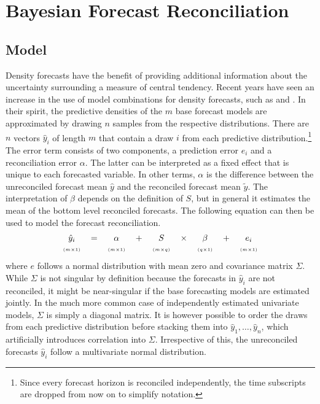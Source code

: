\documentclass[a4paper,fleqn,11pt]{article}
\begin{document}
\clearpage

\section{Bayesian Forecast Reconciliation}
\label{sec:model}
\subsection{Model}
Density forecasts have the benefit of providing additional information about the uncertainty surrounding a measure of central tendency. Recent years have seen an increase in the use of model combinations for density forecasts, such as \cite{Kapetanios2015} and \cite{Cesur2016}. In their spirit, the predictive densities of the $m$ base forecast models are approximated by drawing $n$ samples from the respective distributions. There are $n$ vectors $\hat{y}_{i}$ of length $m$ that contain a draw $i$ from each predictive distribution.\footnote{Since every forecast horizon is reconciled independently, the time subscripts are dropped from now on to simplify notation.} The error term consists of two components, a prediction error $e_{i}$ and a reconciliation error $\alpha$. The latter can be interpreted as a fixed effect that is unique to each forecasted variable. In other terms, $\alpha$ is the difference between the unreconciled forecast mean $\hat{y}$ and the reconciled forecast mean $\tilde{y}$. The interpretation of $\beta$ depends on the definition of $S$, but in general it estimates the mean of the bottom level reconciled forecasts. The following equation can then be used to model the forecast reconciliation.
\begin{align}
\label{eq:main}
\begin{tabular}{ccccccccc}
	$\hat{y}_i$ & $=$ & $\alpha$ & + &$S$ & $\times$ & $\beta$ & $+$ & $e_i$ \\
	$\scriptscriptstyle (m\times 1)$ & & $\scriptscriptstyle (m\times 1)$  & & $ \scriptscriptstyle (m\times q) $ & & $\scriptscriptstyle (q\times 1)$ & & $\scriptscriptstyle (m\times 1)$
\end{tabular}
\end{align}
where $e$ follows a normal distribution with mean zero and covariance matrix $\Sigma$. While $\Sigma$ is not singular by definition because the forecasts in $\hat{y}_{i}$ are not reconciled, it might be near-singular if the base forecasting models are estimated jointly. In the much more common case of independently estimated univariate models, $\Sigma$ is simply a diagonal matrix. It is however possible to order the draws from each predictive distribution before stacking them into $\hat{y}_{1},\hdots,\hat{y}_{n}$, which artificially introduces correlation into $\Sigma$. Irrespective of this, the unreconciled forecasts $\hat{y}_{i}$ follow a multivariate normal distribution.
\end{document}
